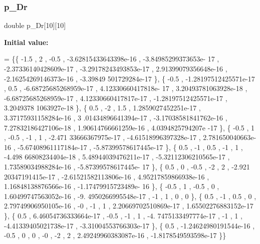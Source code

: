 \subsubsection{\texorpdfstring{p\+\_\+\+Dr}{p\_Dr}}
{\footnotesize\ttfamily double p\+\_\+\+Dr\mbox{[}10\mbox{]}\mbox{[}10\mbox{]}}

{\bfseries Initial value\+:}
\begin{DoxyCode}
= \{\{             -1.5 ,                 2 ,              -0.5 , -3.62815433643398e-16 , -3.84985299373653e-
      17 , -2.37336140428609e-17 , -3.29178243493853e-17 , 2.91399079356648e-16 , -2.16254269146373e-16 , -3.39849
      501729284e-17 \},
\{             -0.5 , -1.28197512425571e-17 ,               0.5 , -6.68725685268959e-17 , 4.12330660417818e-
      17 , 3.20493781063928e-18 , -6.68725685268959e-17 , 4.12330660417817e-17 , -1.28197512425571e-17 , 3.2049378
      1063927e-18 \},
\{              0.5 ,                -2 ,               1.5 , 1.2859027452251e-17 , 3.37175931158284e-16 , 3
      .01434896641394e-17 , -3.17038581841762e-16 , 7.27832186427106e-18 , 1.90614766661259e-16 , 4.0394825794207e
      -17 \},
\{             -0.5 ,                 1 ,              -0.5 ,                -1 ,                 1 , -2.471
      33666367975e-17 , -4.61518996397328e-17 , 2.781650040663e-16 , -5.67408961117184e-17 , -5.87399578617445e-17
       \},
\{              0.5 ,                -1 ,               0.5 ,                -1 ,                 1 , -4.498
      66808234404e-18 , 5.48944039476211e-17 , -5.32112306210565e-17 , 1.73589034988284e-16 , -5.87399578617445e-
      17 \},
\{              0.5 ,                 0 ,              -0.5 ,                -2 ,                 2 , -2.921
      20347191415e-17 , -2.61521582113806e-16 , 4.95217859866938e-16 , 1.16848138876566e-16 , -1.17479915723489e-
      16 \},
\{             -0.5 ,                 1 ,              -0.5 ,                 0 , 1.60499747563052e-16 , -9.
      4950266995548e-17 ,                -1 ,                 1 ,                 0 ,                 0 \},
\{              0.5 ,                -1 ,               0.5 ,                 0 , 2.79749906950105e-16 ,    
                  -0 ,                -1 ,                 1 , 2.20669702510869e-17 , 1.65502276883152e-17 \},
\{              0.5 , 6.46054736333664e-17 ,              -0.5 ,                -1 ,                 1 , -4.
      7475133497774e-17 ,                -1 ,                 1 , -4.41339405021738e-17 , -3.31004553766303e-17 \},
\{              0.5 , -1.24624980191544e-16 ,              -0.5 ,                 0 ,                 0 ,   
                   -0 ,                -2 ,                 2 , 2.49249960383087e-16 , -1.8178549593598e-17 \}\}
\end{DoxyCode}
\mbox{\label{a00482_ada19a548901d8b04fd5c62d0e30d53f7}} 
